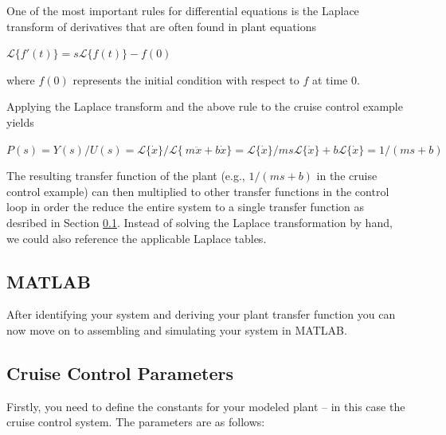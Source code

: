 \documentclass[paper=letter, fontsize=11pt]{scrartcl}
\numberwithin{equation}{section}
\numberwithin{figure}{section}
\numberwithin{table}{section}
\begin{document}
\par
One of the most important rules for differential equations is the Laplace
transform of derivatives that are often found in plant equations

\begin{framed}
\begin{center}
$\mathcal{L}\{f'(t)\} = s \mathcal{L}\{f(t)\} - f(0)$
\end{center}
\end{framed}

where $f(0)$ represents the initial condition with respect to $f$ at time $0$.

\par
Applying the Laplace transform and the above rule to the cruise control example
yields

\begin{framed}
\begin{center}
$P(s) = Y(s) / U(s) = \mathcal{L}\{\dot{x}\} / \mathcal{L}\{\ m\ddot{x} + b\dot{x}\}
= \mathcal{L}\{\dot{x}\} / ms\mathcal{L}\{\dot{x}\} + b\mathcal{L}\{\dot{x}\}
= 1 / (ms + b)$
\end{center}
\end{framed}

\par
The resulting transfer function of the plant (e.g., $1 / (ms + b)$ in the
cruise control example) can then multiplied to other transfer functions in the
control loop in order the reduce the entire system to a single transfer function
as desribed in Section \ref{sec:matlab}. Instead of solving the Laplace
transformation by hand, we could also reference the applicable Laplace tables.

\subsection{\acl{MATLAB}}
\label{sec:matlab}
\par
After identifying your system and deriving your plant transfer function you
can now move on to assembling and simulating your system in \ac{MATLAB}.

\subsection{Cruise Control Parameters}
\label{sec:parameters_cruise_control}
\par
Firstly, you need to define the constants for your modeled plant -- in this
case the cruise control system. The parameters are as follows:
\end{document}
